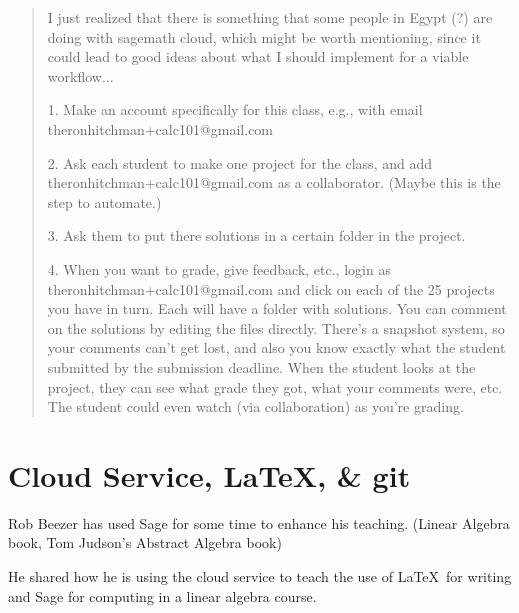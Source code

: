 \documentclass{article}
\begin{document}
\begin{quotation}
I just realized that there is something that some people in Egypt (?)
are doing with sagemath cloud, which might be worth mentioning, since
it could lead to good ideas about what I should implement for a viable
workflow...

1. Make an account specifically for this class, e.g., with email
theronhitchman+calc101@gmail.com

2. Ask each student to make one project for the class, and add
theronhitchman+calc101@gmail.com as a collaborator.  (Maybe this is
the step to automate.)

3. Ask them to put there solutions in a certain folder in the project.

4. When you want to grade, give feedback, etc., login as
theronhitchman+calc101@gmail.com and click on each of the 25 projects
you have in turn. Each will have a folder with solutions.  You can
comment on the solutions by editing the files directly.  There's a
snapshot system, so your comments can't get lost, and also you know
exactly what the student submitted by the submission deadline.   When
the student looks at the project, they can see what grade they got,
what your comments were, etc.
The student could even watch (via collaboration) as you're grading.
\end{quotation}

\clearpage

\section{Cloud Service, \LaTeX, \& git}

Rob Beezer has used Sage for some time to enhance his teaching. (Linear Algebra book, Tom Judson's Abstract Algebra book)

He shared how he is using the cloud service to teach the use of \LaTeX\ for writing and Sage for computing in a linear algebra course.
\end{document}
